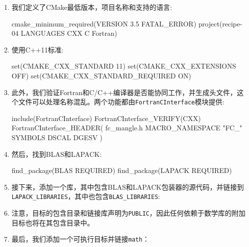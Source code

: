 \begin{enumerate}
\item 我们定义了CMake最低版本，项目名称和支持的语言:

\begin{codebox}[cmake]
cmake_minimum_required(VERSION 3.5 FATAL_ERROR)
project(recipe-04 LANGUAGES CXX C Fortran)
\end{codebox}

\item 使用C++11标准:

\begin{codebox}[cmake]
set(CMAKE_CXX_STANDARD 11)
set(CMAKE_CXX_EXTENSIONS OFF)
set(CMAKE_CXX_STANDARD_REQUIRED ON)
\end{codebox}

\item 此外，我们验证Fortran和C/C++编译器是否能协同工作，并生成头文件，这个文件可以处理名称混乱。两个功能都由\texttt{FortranCInterface}模块提供:

\begin{codebox}[cmake]
include(FortranCInterface)
FortranCInterface_VERIFY(CXX)
FortranCInterface_HEADER(
  fc_mangle.h
  MACRO_NAMESPACE "FC_"
  SYMBOLS DSCAL DGESV
  )
\end{codebox}

\item 然后，找到BLAS和LAPACK:

\begin{codebox}[cmake]
find_package(BLAS REQUIRED)
find_package(LAPACK REQUIRED)
\end{codebox}

\item 接下来，添加一个库，其中包含BLAS和LAPACK包装器的源代码，并链接到\texttt{LAPACK\_LIBRARIES}，其中也包含\texttt{BLAS\_LIBRARIES}:


\item 注意，目标的包含目录和链接库声明为\texttt{PUBLIC}，因此任何依赖于数学库的附加目标也将在其包含目录中。

\item 最后，我们添加一个可执行目标并链接\texttt{math}：


\end{enumerate}
